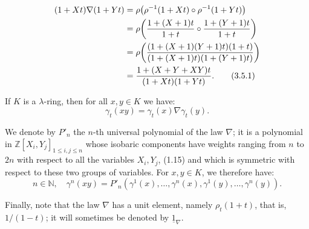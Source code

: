%
\begin{align}
 (1+Xt)\nabla(1+Yt)
 &=\rho\!\left(\rho^{-1}(1+Xt)\circ\rho^{-1}(1+Yt)\right) \notag\\
 &=\rho\!\left(\frac{1+(X+1)t}{1+t}\circ
                 \frac{1+(Y+1)t}{1+t}\right) \notag\\
 &=\rho\!\left(\frac{(1+(X+1)(Y+1)t)(1+t)}
                      {(1+(X+1)t)(1+(Y+1)t)}\right) \notag\\
 &=\frac{1+(X+Y+XY)t}{(1+Xt)(1+Yt)} . \tag{3.5.1}
\end{align}

If \(K\) is a \(\lambda\)-ring, then for all \(x,y\in K\) we have:
\begin{equation}\tag{3.5.2}
  \gamma_t(xy)=\gamma_t(x)\nabla\gamma_t(y).
\end{equation}

We denote by \(P'_n\) the \(n\)-th universal polynomial of the law \(\nabla\); it is a polynomial in \(\mathbb Z[X_i,Y_j]_{1\le i,j\le n}\) whose isobaric components have weights ranging from \(n\) to \(2n\) with respect to all the variables \(X_i,Y_j\), (1.15) and which is symmetric with respect to these two groups of variables. For \(x,y\in K\), we therefore have:
\begin{equation}\tag{3.5.3}
  n\in\mathbb N,\quad \gamma^n(xy)
  =P'_n(\gamma^1(x),\ldots,\gamma^n(x),
       \gamma^1(y),\ldots,\gamma^n(y)).
\end{equation}

Finally, note that the law \(\nabla\) has a unit element, namely \(\rho_t(1+t)\), that is, \(1/(1-t)\); it will sometimes be denoted by \(\underline{1}_\nabla\).

